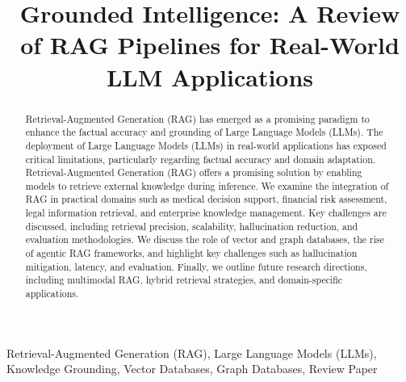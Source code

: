 \documentclass[conference]{IEEEtran}
\begin{document}
\title{Grounded Intelligence: A Review of RAG Pipelines for Real-World LLM Applications}

\author{
   
}

\maketitle

\begin{abstract}
Retrieval-Augmented Generation (RAG) has emerged as a promising paradigm to enhance the factual accuracy and grounding of Large Language Models (LLMs). The deployment of Large Language Models (LLMs) in real-world applications has exposed critical limitations, particularly regarding factual accuracy and domain adaptation. Retrieval-Augmented Generation (RAG) offers a promising solution by enabling models to retrieve external knowledge during inference. We examine the integration of RAG in practical domains such as medical decision support, financial risk assessment, legal information retrieval, and enterprise knowledge management. Key challenges are discussed, including retrieval precision, scalability, hallucination reduction, and evaluation methodologies. We discuss the role of vector and graph databases, the rise of agentic RAG frameworks, and highlight key challenges such as hallucination mitigation, latency, and evaluation. Finally, we outline future research directions, including multimodal RAG, hybrid retrieval strategies, and domain-specific applications.
\end{abstract}

\begin{IEEEkeywords}
Retrieval-Augmented Generation (RAG), Large Language Models (LLMs), Knowledge Grounding, Vector Databases, Graph Databases, Review Paper
\end{IEEEkeywords}
\end{document}
